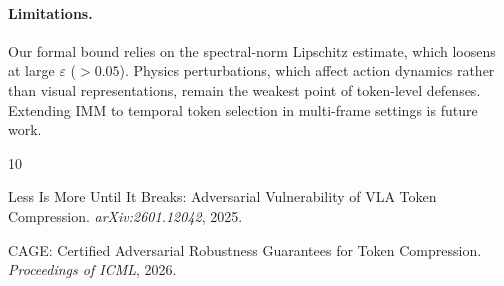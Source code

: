 \documentclass[10pt,twocolumn]{article}
\newcommand{\eps}{\varepsilon}
\begin{document}
\paragraph{Limitations.} Our formal bound relies on the spectral-norm Lipschitz estimate, which loosens at large $\eps$ ($>0.05$). Physics perturbations, which affect action dynamics rather than visual representations, remain the weakest point of token-level defenses. Extending IMM to temporal token selection in multi-frame settings is future work.


\begin{thebibliography}{10}

Less Is More Until It Breaks: Adversarial Vulnerability of VLA Token Compression.
\textit{arXiv:2601.12042}, 2025.

CAGE: Certified Adversarial Robustness Guarantees for Token Compression.
\textit{Proceedings of ICML}, 2026.

\end{thebibliography}
\end{document}
